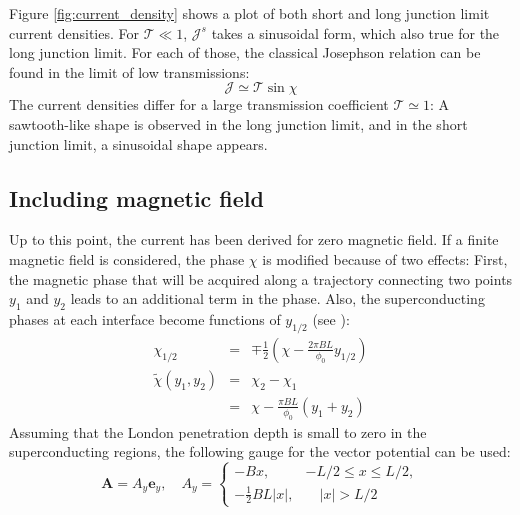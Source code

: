 Figure \ref{fig:current_density} shows a plot of both short and long junction limit current densities. For $\mathcal{T} \ll 1$, $\mathcal{J}^s$ takes a sinusoidal form, which also true for the long junction limit. For each of those, the classical Josephson relation can be found in the limit of low transmissions:
\begin{equation}
\mathcal{J} \simeq \mathcal{T} \sin \chi \label{eq:josephson-low-t}
\end{equation} The current densities differ for a large transmission coefficient $\mathcal{T} \simeq 1$: A sawtooth-like shape is observed in the long junction limit, and in the short junction limit, a sinusoidal shape appears.\\

\subsection*{Including magnetic field}
Up to this point, the current has been derived for zero magnetic field. If a finite magnetic field is considered, the phase $\chi$ is modified because of two effects: First, the magnetic phase that will be acquired along a trajectory connecting two points $y_1$ and $y_2$  leads to an additional term in the phase. Also, the superconducting phases at each interface become functions of $y_{1/2}$ (see \cite{Meier2016}):
\begin{eqnarray}
\chi_{1/2} &=& \mp \frac{1}{2}\left( \chi - \frac{2 \pi B L }{\phi_0} y_{1/2}\right) \\
\tilde{\chi}(y_1, y_2) &=& \chi_2 - \chi_1 \\
 &=& \chi - \frac{\pi B L}{\phi_0}(y_1 + y_2)
 \label{eq:chi}
\end{eqnarray}
Assuming that the London penetration depth is small to zero in the superconducting regions, the following gauge for the vector potential can be used:
\begin{equation}
\mathbf{A}=A_y \mathbf{e}_y, \quad
A_y=\left\{ 
		\begin{array}{ll}
				-B x, & -L/2 \leq x \leq L/2, \\[0.2cm] 
				-\frac{1}{2} B L |x| , & \quad |x|>L/2
		\end{array} 
	\right.
\label{eq:Ay}
\end{equation}

